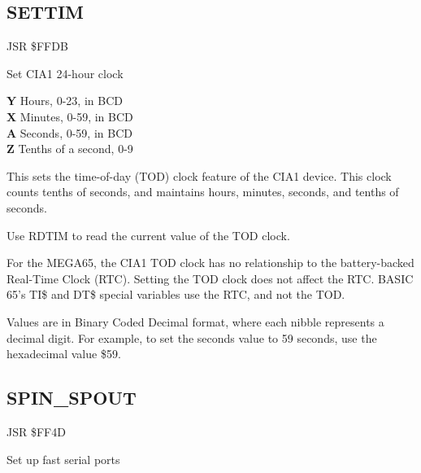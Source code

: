 \subsection{SETTIM}
\label{KERNAL Jump Table!SETTIM}
\begin{description}[leftmargin=2cm,style=nextline]
    \item [Address:] JSR \$FFDB
    \item [Description:] Set CIA1 24-hour clock
    \item [Inputs:]
        \textbf{Y} Hours, 0-23, in BCD \\
        \textbf{X} Minutes, 0-59, in BCD \\
        \textbf{A} Seconds, 0-59, in BCD \\
        \textbf{Z} Tenths of a second, 0-9
    \item [Remarks:]
        This sets the time-of-day (TOD) clock feature of the CIA1 device. This clock counts tenths of seconds, and maintains hours, minutes, seconds, and tenths of seconds.

        Use RDTIM to read the current value of the TOD clock.

        For the MEGA65, the CIA1 TOD clock has no relationship to the battery-backed Real-Time Clock (RTC). Setting the TOD clock does not affect the RTC. BASIC 65's TI\$ and DT\$ special variables use the RTC, and not the TOD.

        Values are in Binary Coded Decimal format, where each nibble represents a decimal digit. For example, to set the seconds value to 59 seconds, use the hexadecimal value \$59.
    \item [Example:]
\end{description}



\newpage
\subsection{SPIN{\_}SPOUT}
\label{KERNAL Jump Table!SPIN_SPOUT}
\begin{description}[leftmargin=2cm,style=nextline]
    \item [Address:] JSR \$FF4D
    \item [Description:] Set up fast serial ports
    \item [Inputs:]
    \item [Outputs:]
    \item [Remarks:]
    \item [Example:]
\end{description}


